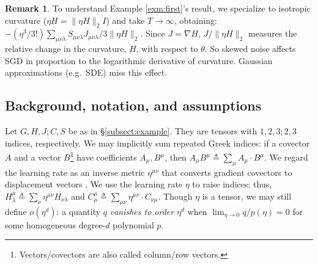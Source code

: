 \documentclass{article}
\theoremstyle{plain}
\theoremstyle{definition}
\newtheorem{rmk}{Remark}
\begin{document}
        \begin{rmk}
            To understand Example \ref{exm:first}'s result, we specialize
            to isotropic curvature ($\eta H = \|\eta H\|_2 I$) and take $T\to
            \infty$, obtaining:
            $
                - (\eta^3/3!)
                \sum_{\mu\nu\lambda}
                    S_{\mu\nu\lambda} J_{\mu\nu\lambda} / 3 \|\eta H\|_2
            $.
            Since $J = \nabla H$, $J / \|\eta H\|_2$ measures the relative
            change in the curvature, $H$, with respect to $\theta$.  So skewed
            noise affects SGD in proportion to the logarithmic derivative of
            curvature.  Gaussian approximations (e.g.\ SDE) miss this effect. 
        \end{rmk}


\subsection{Background, notation, and assumptions} \label{sect:background}
       

        Let $G, H, J; C, S$ be as in \S \ref{subsect:example}.  They are
        tensors with $1, 2, 3; 2, 3$ indices, respectively.
        We may implicitly sum repeated Greek indices: if a covector $A$
        and a vector $B$\footnote{
            Vectors/covectors are also called column/row vectors. 
        } have coefficients $A_\mu, B^\mu$, then 
        $
            A_\mu B^\mu
            \triangleq
            \sum_\mu A_\mu \cdot B^\mu
        $.
        We regard the learning rate as an
        inverse metric $\eta^{\mu\nu}$ that converts gradient covectors to
        displacement vectors \citep{bo13}.  We use the learning rate
        $\eta$ to raise indices; thus,
        $
            H^{\mu}_{\lambda}
            \triangleq
            \sum_{\nu} 
            \eta^{\mu\nu} H_{\nu\lambda}
        $ and
        $
            C^{\mu}_{\mu}
            \triangleq
            \sum_{\mu \nu} \eta^{\mu\nu} \cdot C_{\nu\mu}
        $.
        Though $\eta$ is a tensor, we may still define $o(\eta^d)$: a quantity
        $q$ \emph{vanishes to order $\eta^d$} when $\lim_{\eta\to 0} q/p(\eta)
        = 0$ for some homogeneous degree-$d$ polynomial $p$.
\end{document}
